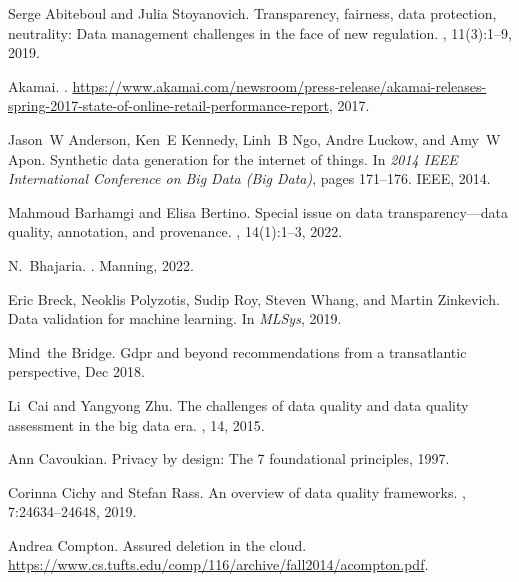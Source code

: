 \documentclass[11pt]{article} %
\begin{document}
\begin{thebibliography}{10}
\itemsep=1pt
\begin{small}

Serge Abiteboul and Julia Stoyanovich.
\newblock Transparency, fairness, data protection, neutrality: Data management
  challenges in the face of new regulation.
, 11(3):1--9,
  2019.

Akamai.
.
\newblock
  \url{https://www.akamai.com/newsroom/press-release/akamai-releases-spring-2017-state-of-online-retail-performance-report},
  2017.

Jason~W Anderson, Ken~E Kennedy, Linh~B Ngo, Andre Luckow, and Amy~W Apon.
\newblock Synthetic data generation for the internet of things.
\newblock In {\em 2014 IEEE International Conference on Big Data (Big Data)},
  pages 171--176. IEEE, 2014.

Mahmoud Barhamgi and Elisa Bertino.
\newblock Special issue on data transparency—data quality, annotation, and
  provenance.
, 14(1):1--3,
  2022.

N.~Bhajaria.
.
\newblock Manning, 2022.

Eric Breck, Neoklis Polyzotis, Sudip Roy, Steven Whang, and Martin Zinkevich.
\newblock Data validation for machine learning.
\newblock In {\em MLSys}, 2019.

Mind~the Bridge.
\newblock Gdpr and beyond recommendations from a transatlantic perspective, Dec
  2018.

Li~Cai and Yangyong Zhu.
\newblock The challenges of data quality and data quality assessment in the big
  data era.
, 14, 2015.

Ann Cavoukian.
\newblock Privacy by design: The 7 foundational principles, 1997.

Corinna Cichy and Stefan Rass.
\newblock An overview of data quality frameworks.
, 7:24634--24648, 2019.

Andrea Compton.
\newblock Assured deletion in the cloud.
\newblock
  \url{https://www.cs.tufts.edu/comp/116/archive/fall2014/acompton.pdf}.


\end{small}
\end{thebibliography}
\end{document}
